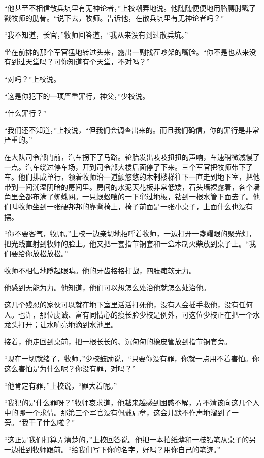     “他甚至不相信散兵坑里有无神论者，”上校嘲弄地说。他随随便便地用胳膊肘戳了戳牧师的肋骨。“说下去，牧师。告诉他，在散兵坑里有无神论者吗？”

    “我不知道，长官，”牧师回答道，“我从来没有到过散兵坑。”

    坐在前排的那个军官猛地转过头来，露出一副找茬吵架的嘴脸。“你不是也从来没有到过天堂吗？可你知道有个天堂，不对吗？”

    “对吗？”上校说。

    “这是你犯下的一项严重罪行，神父，”少校说。

    “什么罪行？”

    “我们还不知道，”上校说，“但我们会调查出来的。而且我们确信，你的罪行是非常严重的。”

    在大队司令部门前，汽车拐下了马路。轮胎发出吱吱扭扭的声响，车速稍微减慢了一点。汽车绕过停车场，开到司令部大楼后面停了下来。三个军官把牧师带下了车。他们排成单行，领着牧师沿一道颤悠悠的木制楼梯往下一直走到地下室，把他带到一间潮湿阴暗的房间里。房间的水泥天花板非常低矮，石头墙裸露着，各个墙角里全都布满了蜘蛛网。一只蜈蚣嗖的一下窜过地板，钻到一根水管下面去了。他们叫牧师坐到一张硬邦邦的靠背椅上，椅子前面是一张小桌子，上面什么也没有摆。

    “你不要客气，牧师。”上校一边亲切地招呼着牧师，一边打开一盏耀眼的聚光灯，把光线直射到牧师的脸上。他又把一套指节铜套和一盒木制火柴放到桌子上。“我们要给你放松放松。”

    牧师不相信地瞪起眼睛。他的牙齿格格打战，四肢瘫软无力。

    他感到无能为力。他知道，他们可以想怎么处治他就怎么处治他。

    这几个残忍的家伙可以就在地下室里活活打死他，没有人会插手救他，没有任何人。也许，那位虔诚、富有同情心的瘦长脸少校是例外，可这位少校正在把一个水龙头打开；让水响亮地滴到水池里。

    接着，他走回到桌前，把一根长长的、沉甸甸的橡皮管放到指节铜套旁。

    “现在一切就绪了，牧师，”少校鼓励说，“只要你没有罪，你就一点用不着害怕。你这么害怕是为什么呢？你没有罪，对吗？”

    “他肯定有罪，”上校说，“罪大着呢。”

    “我犯的是什么罪呀？”牧师哀求道，他越来越感到困惑不解，弄不清该向这几个人中的哪一个求情。那第三个军官没有佩戴肩章，这会儿默不作声地溜到了一旁。“我干了什么啦？”

    “这正是我们打算弄清楚的，”上校回答说。他把一本拍纸薄和一枝铅笔从桌子的另一边推到牧师跟前。“给我们写下你的名字，好吗？用你自己的笔迹。”

